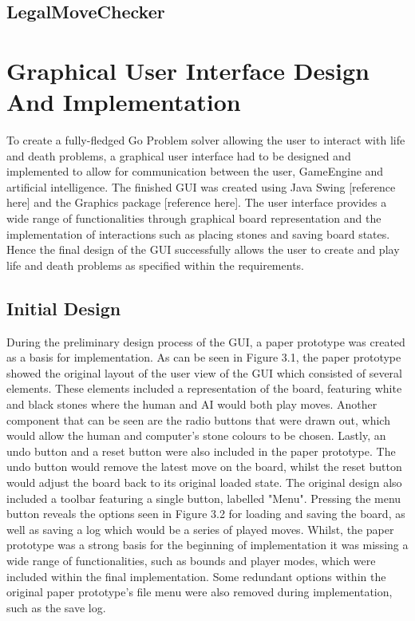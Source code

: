 \documentclass{l3proj}
\begin{document}
\subsection{LegalMoveChecker}

\section{Graphical User Interface Design And Implementation}

To create a fully-fledged Go Problem solver allowing the user to interact with life and death problems, a graphical user interface had to be designed and implemented to allow for communication between the user, GameEngine and artificial intelligence. The finished GUI was created using Java Swing [reference here] and the Graphics package [reference here]. The user interface provides a wide range of functionalities through graphical board representation and the implementation of interactions such as placing stones and saving board states. Hence the final design of the GUI successfully allows the user to create and play life and death problems as specified within the requirements.

\subsection{Initial Design}

During the preliminary design process of the GUI, a paper prototype was created as a basis for implementation. As can be seen in Figure 3.1, the paper prototype showed the original layout of the user view of the GUI which consisted of several elements. These elements included a representation of the board, featuring white and black stones where the human and AI would both play moves. Another component that can be seen are the radio buttons that were drawn out, which would allow the human and computer's stone colours to be chosen. Lastly, an undo button and a reset button were also included in the paper prototype. The undo button would remove the latest move on the board, whilst the reset button would adjust the board back to its original loaded state. The original design also included a toolbar featuring a single button, labelled "Menu".  Pressing the menu button reveals the options seen in Figure 3.2 for loading and saving the board, as well as saving a log which would be a series of played moves. Whilst, the paper prototype was a strong basis for the beginning of implementation it was missing a wide range of functionalities, such as bounds and player modes, which were included within the final implementation. Some redundant options within the original paper prototype's file menu were also removed during implementation, such as the save log.
\end{document}
